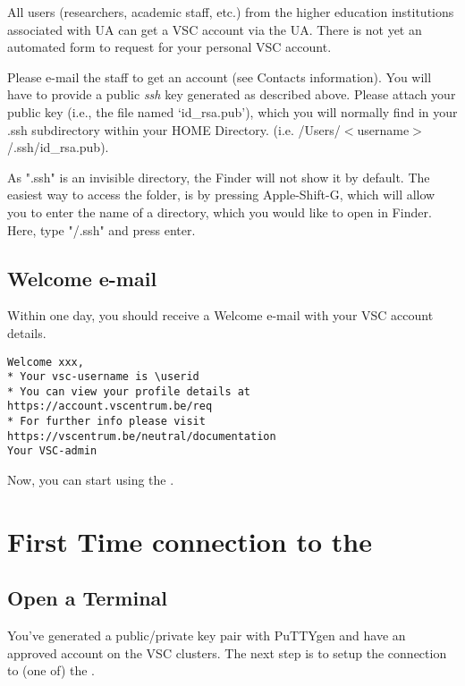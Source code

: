 All users (researchers, academic staff, etc.) from the higher education
institutions associated with UA can get a VSC account via the UA. There is not
yet an automated form to request for your personal VSC account.

Please e-mail the \hpc staff to get an account (see Contacts information).
You will have to provide a public \emph{ssh} key generated as described
above. Please attach your public key (i.e., the file named `id\_rsa.pub'),
which you will normally find in your .ssh subdirectory within your HOME
Directory. (i.e. /Users/$<$username$>$/.ssh/id\_rsa.pub).


\ifmac

   As ".ssh" is an invisible directory, the Finder will
  not show it by default. The easiest way to access the folder, is by pressing
  Apple-Shift-G, which will allow you to enter the name of a directory, which
  you would like to open in Finder. Here, type "\tilde/.ssh" and press enter.

\fi
\fi

\subsection{Welcome e-mail}
\label{sec:welcome-email}

Within one day, you should receive a Welcome e-mail with your VSC account details.

\begin{verbatim}
Welcome xxx,
* Your vsc-username is \userid
* You can view your profile details at https://account.vscentrum.be/req
* For further info please visit https://vscentrum.be/neutral/documentation
Your VSC-admin
\end{verbatim}

Now, you can start using the \hpc.

\section{First Time connection to the \hpc}
\label{sec:first-time-connection-to-the-hpc}

\ifwindows

  \subsection{Open a Terminal}
  \label{sec:windows-open-a-terminal}

  You've generated a public/private key pair with PuTTYgen and have an approved
  account on the VSC clusters.  The next step is to setup the connection to (one
  of) the \hpc.

